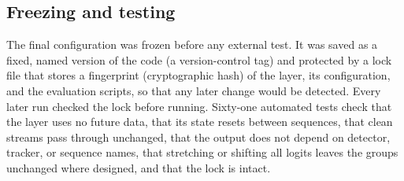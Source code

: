 \subsection{Freezing and testing}\label{sec:freeze}
The final configuration was frozen before any external test. It was saved as
a fixed, named version of the code (a version-control tag) and protected by a
lock file that stores a fingerprint (cryptographic hash) of the layer, its
configuration, and the evaluation scripts, so that any later change would be
detected. Every later run checked the lock before running. Sixty-one automated tests check
that the layer uses no future data, that its state resets between sequences,
that clean streams pass through unchanged, that the output does not depend on
detector, tracker, or sequence names, that stretching or shifting all logits
leaves the groups unchanged where designed, and that the lock is intact.
